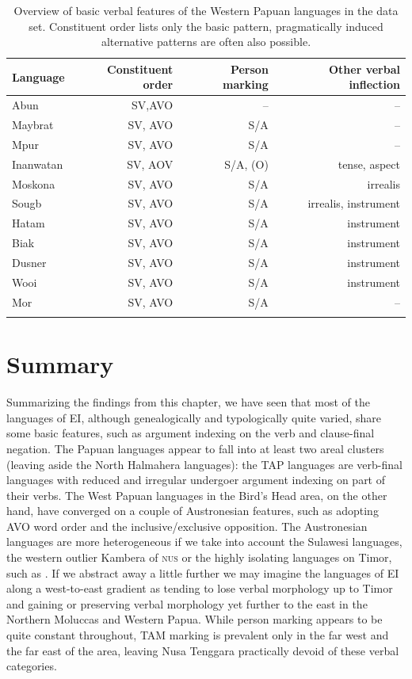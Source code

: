 \begin{table}[h]
\begin{tabular}{l r r r}
\lsptoprule
Language & Constituent order & Person marking & Other verbal inflection \tabularnewline
\midrule
Abun & SV,AVO & -- & -- \tabularnewline
Maybrat & SV, AVO & S/A & -- \tabularnewline
Mpur & SV, AVO & S/A & -- \tabularnewline
Inanwatan & SV, AOV & S/A, (O) & tense, aspect \tabularnewline
\midrule
Moskona & SV, AVO & S/A & irrealis \tabularnewline
Sougb & SV, AVO & S/A & irrealis, instrument \tabularnewline
Hatam & SV, AVO & S/A & instrument \tabularnewline
\midrule
Biak & SV, AVO & S/A & instrument \tabularnewline
Dusner & SV, AVO & S/A & instrument \tabularnewline
Wooi & SV, AVO & S/A & instrument \tabularnewline
Mor & SV, AVO & S/A & -- \tabularnewline
\lspbottomrule
\end{tabular}
\caption[Basic verbal features of the Western Papuan languages]{Overview of basic verbal features of the Western Papuan languages in the data set. Constituent order lists only the basic pattern, pragmatically induced alternative patterns are often also possible.}
\label{table:overviewpapua}
\end{table}

\section{Summary}
Summarizing the findings from this chapter, we have seen that most of the languages of EI, although genealogically and typologically quite varied, share some basic features, such as argument indexing on the verb and clause-final negation. The Papuan languages appear to fall into at least two areal clusters (leaving aside the North Halmahera languages): the TAP languages are verb-final languages with reduced and irregular undergoer argument indexing on part of their verbs. The West Papuan languages in the Bird's Head area, on the other hand, have converged on a couple of Austronesian features, such as adopting AVO word order and the inclusive/exclusive opposition. The Austronesian languages are more heterogeneous if we take into account the Sulawesi languages, the western outlier Kambera of \textsc{nus} or the highly isolating languages on Timor, such as . If we abstract away a little further we may imagine the languages of EI along a west-to-east gradient as tending to lose verbal morphology up to Timor and gaining or preserving verbal morphology yet further to the east in the Northern Moluccas and Western Papua. While person marking appears to be quite constant throughout, TAM marking is prevalent only in the far west and the far east of the area, leaving Nusa Tenggara practically devoid of these verbal categories.


